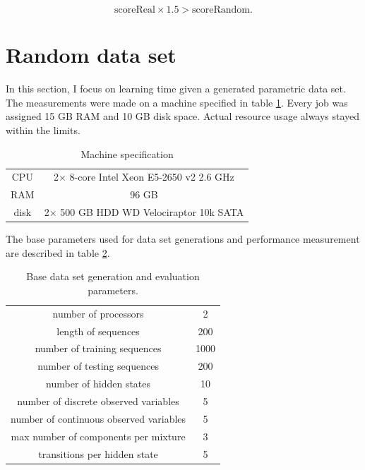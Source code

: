\documentclass[thesis=B,english]{FITthesis}[2012/06/26]
\begin{document}
\begin{equation*}
\text{scoreReal} \times 1.5 > \text{scoreRandom}.
\end{equation*}

\section{Random data set}

In this section, I focus on learning time given a generated parametric data set. The measurements were made on a machine specified in table \ref{tab:machine-specification}. Every job was assigned 15 GB RAM and 10 GB disk space. Actual resource usage always stayed within the limits.

\begin{table}
\centering
\begin{tabular}{|c|c|}
	\hline
	CPU & 2$\times$ 8-core Intel Xeon E5-2650 v2 2.6 GHz \\
	RAM & 96 GB \\
	disk & 2$\times$ 500 GB HDD WD Velociraptor 10k SATA \\
	\hline
\end{tabular}
\caption{Machine specification \cite{machine-specification}}
\label{tab:machine-specification}
\end{table}

The base parameters used for data set generations and performance measurement are described in table \ref{tab:base-parameters}.

\begin{table}
\centering
\begin{tabular}{|c|c|}
	\hline
	number of processors & 2 \\
	length of sequences & 200 \\
	number of training sequences & 1000 \\
	number of testing sequences & 200 \\
	number of hidden states & 10 \\
	number of discrete observed variables & 5 \\
	number of continuous observed variables & 5 \\
	max number of components per mixture & 3 \\
	transitions per hidden state & 5 \\
	\hline
\end{tabular}
\caption{Base data set generation and evaluation parameters.}
\label{tab:base-parameters}
\end{table}
\end{document}
